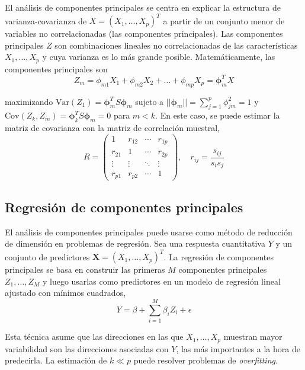 El análisis de componentes principales se centra en explicar la estructura de varianza-covarianza de $X = (X_1, \dots, X_p)^T$ a partir de un conjunto menor de variables no correlacionadas (las componentes principales). Las componentes principales $Z$ son combinaciones lineales no correlacionadas de las características $X_1, \dots, X_p$ y cuya varianza es lo más grande posible. Matemáticamente, las componentes principales son 
\begin{equation}
Z_m = \phi_{m1}X_1 + \phi_{m2}X_2 + \dots + \phi_{mp}X_p = \boldsymbol{\phi}_m^T X
\end{equation}

\noindent maximizando $\text{Var}(Z_1) = \boldsymbol{\phi}_m^T S \boldsymbol{\phi}_m$ sujeto a $||\boldsymbol{\phi}_m|| = \sum_{j=1}^p \phi_{jm}^2 = 1$ y $\text{Cov} (Z_k, Z_m) = \boldsymbol{\phi}_k^T S \boldsymbol{\phi}_m = 0$ para $m < k$. En este caso, se puede estimar la matriz de covarianza con la matriz de correlación muestral, 
\begin{equation}
R = \begin{pmatrix}
1 & r_{12} & \cdots & r_{1p} \\
r_{21} & 1 & \cdots & r_{2p} \\
\vdots & \vdots & \ddots & \vdots \\
r_{p1} & r_{p2} & \cdots & 1
\end{pmatrix}, \quad r_{ij} = \frac{s_{ij}}{s_i s_j}
\end{equation}

\subsection{Regresión de componentes principales}

El análisis de componentes principales puede usarse como método de reducción de dimensión en problemas de regresión. Sea una respuesta cuantitativa $Y$ y un conjunto de predictores $\mathbf{X} = (X_1, \dots, X_p)^T$. La regresión de componentes principales se basa en construir las primeras $M$ componentes principales $Z_1, \dots, Z_M$ y luego usarlas como predictores en un modelo de regresión lineal ajustado con mínimos cuadrados, 
\begin{equation}
Y = \beta + \sum_{i=1}^M \beta_i Z_i + \epsilon
\end{equation}

Esta técnica asume que las direcciones en las que $X_1, \dots, X_p$ muestran mayor variabilidad son las direcciones asociadas con $Y$, las más importantes a la hora de predecirla. La estimación de $k \ll p$ puede resolver problemas de \textit{overfitting}.

